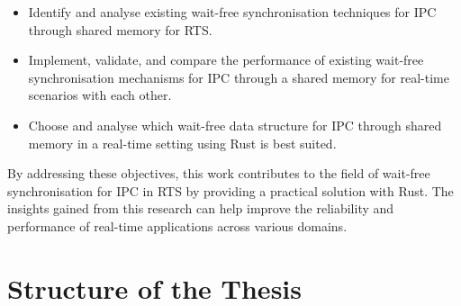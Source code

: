\begin{itemize}
\item Identify and analyse existing wait-free synchronisation techniques for \ac{IPC} through shared memory for \ac{RTS}.
\item Implement, validate, and compare the performance of existing wait-free synchronisation mechanisms for \ac{IPC} through a shared memory for real-time scenarios with each other.
\item Choose and analyse which wait-free data structure for \ac{IPC} through shared memory in a real-time setting using Rust is best suited.
\end{itemize}

By addressing these objectives, this work contributes to the field of wait-free synchronisation for \ac{IPC} in \ac{RTS} by providing a practical solution with Rust. The insights gained from this research can help improve the reliability and performance of real-time applications across various domains.

\section{Structure of the Thesis}\label{sec:structure-of-the-thesis}